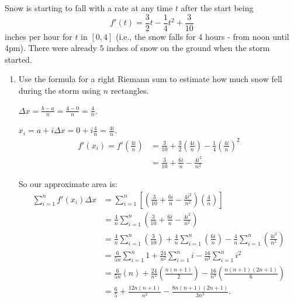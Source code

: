 \documentclass[nooutcomes]{ximera}
\begin{document}
\begin{problem}
Snow is starting to fall with a rate at any time $t$ after the start being 
$$ f'(t) = \frac{3}{2} t - \frac{1}{4} t^2 + \frac{3}{10} $$
inches per hour for $t$ in $[0,4]$ (i.e., the snow falls for 4 hours - from noon until 4pm).  
There were already $5$ inches of snow on the ground when the storm started.  
	\begin{enumerate}
	
	\item  Use the formula for a right Riemann sum to estimate how much snow fell during the storm using $n$ rectangles.
		\begin{freeResponse}
		$\Delta x = \frac{b-a}{n} = \frac{4-0}{n} = \frac{4}{n}$.
		
		$x_i = a + i \Delta x = 0 + i \frac{4}{n} = \frac{4i}{n}$.
			\begin{align*}
			f'(x_i) = f' \left( \frac{4i}{n} \right) &= \frac{3}{10} + \frac{3}{2} \left( \frac{4i}{n} \right) - \frac{1}{4} \left( \frac{4i}{n} \right)^2  \\
			&= \frac{3}{10} + \frac{6i}{n} - \frac{4i^2}{n^2}
			\end{align*}
			
		So our approximate area is:
			\begin{align*}
			\sum_{i=1}^n f'(x_i) \Delta x &= \sum_{i=1}^n \left[ \left( \frac{3}{10} + \frac{6i}{n} - \frac{4i^2}{n^2} \right) \left( \frac{4}{n} \right) \right]  \\
			&= \frac{4}{n} \sum_{i=1}^n \left( \frac{3}{10} + \frac{6i}{n} - \frac{4i^2}{n^2} \right)  \\
			&= \frac{4}{n} \sum_{i=1}^n \left( \frac{3}{10} \right) + \frac{4}{n} \sum_{i=1}^n \left( \frac{6i}{n} \right) - \frac{4}{n} \sum_{i=1}^n \left( \frac{4i^2}{n^2} \right)  \\
			&= \frac{6}{5n} \sum_{i=1}^n 1 + \frac{24}{n^2} \sum_{i=1}^n i - \frac{16}{n^3} \sum_{i=1}^n i^2  \\
			&= \frac{6}{5n} (n) + \frac{24}{n^2} \left( \frac{n(n+1)}{2} \right) - \frac{16}{n^3} \left( \frac{n(n+1)(2n+1)}{6} \right)  \\
			&= \frac{6}{5} + \frac{12n(n+1)}{n^2} - \frac{8n(n+1)(2n+1)}{3n^3}.
			\end{align*}
		\end{freeResponse}
		
		
		

\end{enumerate}
\end{problem}
\end{document}
